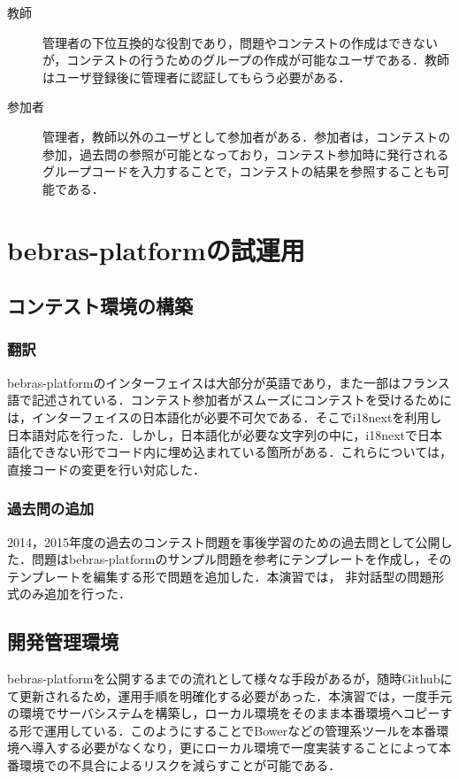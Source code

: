 \documentclass[a4paper]{jarticle}
\begin{document}
\begin{multicols}{2}
\begin{description}
\item[教師] 管理者の下位互換的な役割であり，問題やコンテストの作成はできないが，コンテストの行うためのグループの作成が可能なユーザである．教師はユーザ登録後に管理者に認証してもらう必要がある．
\end{description}

\begin{description}
\item[参加者] 管理者，教師以外のユーザとして参加者がある．参加者は，コンテストの参加，過去問の参照が可能となっており，コンテスト参加時に発行されるグループコードを入力することで，コンテストの結果を参照することも可能である．
\end{description}




\section{bebras-platformの試運用}
\subsection{コンテスト環境の構築}
\subsubsection{翻訳}
bebras-platformのインターフェイスは大部分が英語であり，また一部はフランス語で記述されている．コンテスト参加者がスムーズにコンテストを受けるためには，インターフェイスの日本語化が必要不可欠である．そこでi18nextを利用し日本語対応を行った．しかし，日本語化が必要な文字列の中に，i18nextで日本語化できない形でコード内に埋め込まれている箇所がある．これらについては，直接コードの変更を行い対応した．

\subsubsection{過去問の追加}
2014，2015年度の過去のコンテスト問題を事後学習のための過去問として公開した．問題はbebras-platformのサンプル問題を参考にテンプレートを作成し，そのテンプレートを編集する形で問題を追加した．本演習では，
非対話型の問題形式のみ追加を行った．

\subsection{開発管理環境}
bebras-platformを公開するまでの流れとして様々な手段があるが，随時Githubにて更新されるため，運用手順を明確化する必要があった．本演習では，一度手元の環境でサーバシステムを構築し，ローカル環境をそのまま本番環境へコピーする形で運用している．このようにすることでBowerなどの管理系ツールを本番環境へ導入する必要がなくなり，更にローカル環境で一度実装することによって本番環境での不具合によるリスクを減らすことが可能である．


\end{multicols}
\end{document}
